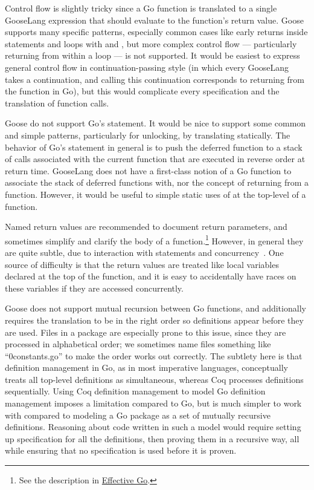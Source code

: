 Control flow is slightly tricky since a Go function is translated
to a single GooseLang expression that should evaluate to the function's
return value. Goose supports many specific patterns, especially common
cases like early returns inside  statements and loops with
 and , but more complex control flow ---
particularly returning from within a loop --- is not supported. It would be
easiest to express general control flow in continuation-passing style (in which
every GooseLang takes a continuation, and calling this continuation corresponds
to returning from the function in Go), but this
would complicate every specification and the translation of function calls.

Goose do not support Go's  statement. It would be nice to support some
common and simple patterns, particularly for unlocking, by translating
 statically. The behavior of Go's  statement in general is
to push the deferred function to a stack of calls associated with the current function that are executed in reverse order at return
time. GooseLang does not have a first-class notion of a Go function to associate
the stack of deferred functions with, nor the concept of returning
from a function. However, it would be useful to simple static uses of 
at the top-level of a function.

Named return values are recommended to document return parameters, and sometimes
simplify and clarify the body of a function.\footnote{See the description in
\href{https://go.dev/doc/effective_go\#named-results}{Effective Go}.} However, in
general they are quite subtle, due to interaction with  statements and
concurrency~\cite{chabbi:golang-races}. One source of difficulty is that the
return values are treated like local variables declared at the top of the
function, and it is easy to accidentally have races on these variables if they
are accessed concurrently.

Goose does not support mutual recursion between Go functions, and
additionally requires the translation to be in the right order so
definitions appear before they are used. Files in a package are especially prone
to this issue, since they are processed in alphabetical order; we sometimes name
files something like ``0constants.go'' to make the order works out correctly.
The subtlety here is that
definition management in Go, as in most imperative languages,
conceptually treats all top-level definitions as simultaneous, whereas
Coq processes definitions sequentially. Using Coq definition management
to model Go definition management imposes a limitation compared to Go,
but is much simpler to work with compared to modeling a Go package as a
set of mutually recursive definitions. Reasoning about code written in such a
model would require setting up specification for all the definitions, then
proving them in a recursive way, all while ensuring that no specification is
used before it is proven.

